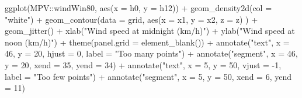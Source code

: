 \documentclass[
  9pt,
  a4paper,
  ignorenonframetext,
  notheorems]{beamer}
\newenvironment{Shaded}{\begin{snugshade}}{\end{snugshade}}
\newcommand{\AttributeTok}[1]{\textcolor[rgb]{0.40,0.45,0.13}{#1}}
\newcommand{\DecValTok}[1]{\textcolor[rgb]{0.68,0.00,0.00}{#1}}
\newcommand{\FunctionTok}[1]{\textcolor[rgb]{0.28,0.35,0.67}{#1}}
\newcommand{\NormalTok}[1]{\textcolor[rgb]{0.00,0.23,0.31}{#1}}
\newcommand{\SpecialCharTok}[1]{\textcolor[rgb]{0.37,0.37,0.37}{#1}}
\newcommand{\StringTok}[1]{\textcolor[rgb]{0.13,0.47,0.30}{#1}}
\begin{document}
\begin{frame}[fragile]
\begin{Shaded}
\begin{Highlighting}[]
\FunctionTok{ggplot}\NormalTok{(MPV}\SpecialCharTok{::}\NormalTok{windWin80, }\FunctionTok{aes}\NormalTok{(}\AttributeTok{x =}\NormalTok{ h0, }\AttributeTok{y =}\NormalTok{ h12)) }\SpecialCharTok{+} 
  \FunctionTok{geom\_density2d}\NormalTok{(}\AttributeTok{col =} \StringTok{"white"}\NormalTok{) }\SpecialCharTok{+}
  \FunctionTok{geom\_contour}\NormalTok{(}\AttributeTok{data =}\NormalTok{ grid, }\FunctionTok{aes}\NormalTok{(}\AttributeTok{x =}\NormalTok{ x1, }\AttributeTok{y =}\NormalTok{ x2, }\AttributeTok{z =}\NormalTok{ z) ) }\SpecialCharTok{+} 
  \FunctionTok{geom\_jitter}\NormalTok{() }\SpecialCharTok{+}
  \FunctionTok{xlab}\NormalTok{(}\StringTok{"Wind speed at midnight (km/h)"}\NormalTok{) }\SpecialCharTok{+}
  \FunctionTok{ylab}\NormalTok{(}\StringTok{"Wind speed at noon (km/h)"}\NormalTok{) }\SpecialCharTok{+}
  \FunctionTok{theme}\NormalTok{(}\AttributeTok{panel.grid =} \FunctionTok{element\_blank}\NormalTok{()) }\SpecialCharTok{+}
  \FunctionTok{annotate}\NormalTok{(}\StringTok{"text"}\NormalTok{, }\AttributeTok{x =} \DecValTok{46}\NormalTok{, }\AttributeTok{y =} \DecValTok{20}\NormalTok{, }\AttributeTok{hjust =} \DecValTok{0}\NormalTok{, }\AttributeTok{label =} \StringTok{"Too many points"}\NormalTok{) }\SpecialCharTok{+} 
  \FunctionTok{annotate}\NormalTok{(}\StringTok{"segment"}\NormalTok{, }\AttributeTok{x =} \DecValTok{46}\NormalTok{, }\AttributeTok{y =} \DecValTok{20}\NormalTok{, }\AttributeTok{xend =} \DecValTok{35}\NormalTok{, }\AttributeTok{yend =} \DecValTok{34}\NormalTok{) }\SpecialCharTok{+} 
  \FunctionTok{annotate}\NormalTok{(}\StringTok{"text"}\NormalTok{, }\AttributeTok{x =} \DecValTok{5}\NormalTok{, }\AttributeTok{y =} \DecValTok{50}\NormalTok{, }\AttributeTok{vjust =} \SpecialCharTok{{-}}\DecValTok{1}\NormalTok{, }\AttributeTok{label =} \StringTok{"Too few points"}\NormalTok{) }\SpecialCharTok{+} 
  \FunctionTok{annotate}\NormalTok{(}\StringTok{"segment"}\NormalTok{, }\AttributeTok{x =} \DecValTok{5}\NormalTok{, }\AttributeTok{y =} \DecValTok{50}\NormalTok{, }\AttributeTok{xend =} \DecValTok{6}\NormalTok{, }\AttributeTok{yend =} \DecValTok{11}\NormalTok{)}
\end{Highlighting}
\end{Shaded}
\end{frame}
\end{document}
